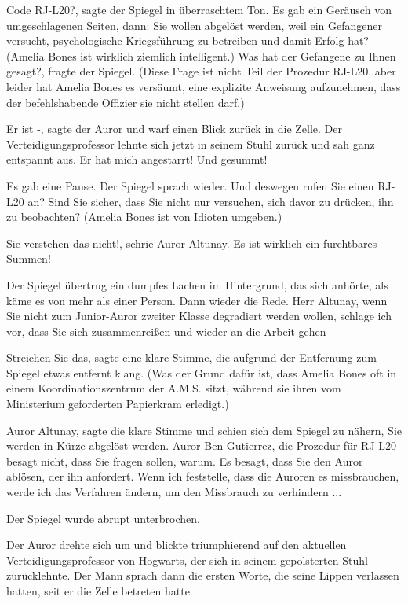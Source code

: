\glqq{}Code RJ-L20?\grqq{}, sagte der Spiegel in überraschtem Ton. Es gab ein
Geräusch von umgeschlagenen Seiten, dann: \glqq{}Sie wollen abgelöst werden, weil
ein Gefangener versucht, psychologische Kriegsführung zu betreiben und damit
Erfolg hat?\grqq{} (Amelia Bones ist wirklich ziemlich intelligent.) \glqq{}Was
hat der Gefangene zu Ihnen gesagt?\grqq{}, fragte der Spiegel. (Diese Frage ist
nicht Teil der Prozedur RJ-L20, aber leider hat Amelia Bones es versäumt, eine
explizite Anweisung aufzunehmen, dass der befehlshabende Offizier sie nicht
stellen darf.)

\glqq{}Er ist -\grqq{}, sagte der Auror und warf einen Blick zurück in die Zelle.
Der Verteidigungsprofessor lehnte sich jetzt in seinem Stuhl zurück und sah ganz
entspannt aus. \glqq{}Er hat mich angestarrt! Und gesummt!\grqq{}

Es gab eine Pause. Der Spiegel sprach wieder. \glqq{}Und deswegen rufen Sie einen
RJ-L20 an? Sind Sie sicher, dass Sie nicht nur versuchen, sich davor zu drücken,
ihn zu beobachten?\grqq{} (Amelia Bones ist von Idioten umgeben.)

\glqq{}Sie verstehen das nicht!\grqq{}, schrie Auror Altunay. \glqq{}Es ist
wirklich ein furchtbares Summen!\grqq{}

Der Spiegel übertrug ein dumpfes Lachen im Hintergrund, das sich anhörte, als
käme es von mehr als einer Person. Dann wieder die Rede. \glqq{}Herr Altunay,
wenn Sie nicht zum Junior-Auror zweiter Klasse degradiert werden wollen, schlage
ich vor, dass Sie sich zusammenreißen und wieder an die Arbeit gehen -\grqq{}

\glqq{}Streichen Sie das\grqq{}, sagte eine klare Stimme, die aufgrund der
Entfernung zum Spiegel etwas entfernt klang. (Was der Grund dafür ist, dass
Amelia Bones oft in einem Koordinationszentrum der A.M.S. sitzt, während sie
ihren vom Ministerium geforderten Papierkram erledigt.)

\glqq{}Auror Altunay\grqq{}, sagte die klare Stimme und schien sich dem Spiegel
zu nähern, \glqq{}Sie werden in Kürze abgelöst werden. Auror Ben Gutierrez, die
Prozedur für RJ-L20 besagt nicht, dass Sie fragen sollen, warum. Es besagt, dass
Sie den Auror ablösen, der ihn anfordert. Wenn ich feststelle, dass die Auroren
es missbrauchen, werde ich das Verfahren ändern, um den Missbrauch zu
verhindern ...\grqq{}

Der Spiegel wurde abrupt unterbrochen.

Der Auror drehte sich um und blickte triumphierend auf den aktuellen
Verteidigungsprofessor von Hogwarts, der sich in seinem gepolsterten Stuhl
zurücklehnte. Der Mann sprach dann die ersten Worte, die seine Lippen verlassen
hatten, seit er die Zelle betreten hatte.

